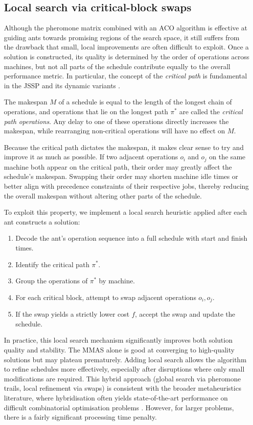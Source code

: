 \documentclass[final-report]{report-template}
\begin{document}
\subsection{Local search via critical-block swaps}
Although the pheromone matrix combined with an ACO algorithm is effective at guiding ants towards promising regions of the search space, it still suffers from the drawback that small, local improvements are often difficult to exploit. Once a solution is constructed, its quality is determined by the order of operations across machines, but not all parts of the schedule contribute equally to the overall performance metric. In particular, the concept of the \emph{critical path} is fundamental in the JSSP and its dynamic variants \cite{naderi2022critical}.

The makespan $M$ of a schedule is equal to the length of the longest chain of operations, and operations that lie on the longest path $\pi^*$ are called the \emph{critical path operations}. Any delay to one of these operations directly increases the makespan, while rearranging non-critical operations will have no effect on $M$.

Because the critical path dictates the makespan, it makes clear sense to try and improve it as much as possible. If two adjacent operations $o_i$ and $o_j$ on the same machine both appear on the critical path, their order may greatly affect the schedule's makespan. Swapping their order may shorten machine idle times or better align with precedence constraints of their respective jobs, thereby reducing the overall makespan without altering other parts of the schedule. 

To exploit this property, we implement a local search heuristic applied after each ant constructs a solution:

\begin{enumerate}
    \item Decode the ant's operation sequence into a full schedule with start and finish times.
    \item Identify the critical path $\pi^*$.
    \item Group the operations of $\pi^*$ by machine.
    \item For each critical block, attempt to swap adjacent operations $o_i, o_j$. 
    \item If the swap yields a strictly lower cost $f$, accept the swap and update the schedule.
\end{enumerate}

In practice, this local search mechanism significantly improves both solution quality and stability. The MMAS alone is good at converging to high-quality solutions but may plateau prematurely. Adding local search allows the algorithm to refine schedules more effectively, especially after disruptions where only small modifications are required. This hybrid approach (global search via pheromone trails, local refinement via swaps) is consistent with the broader metaheuristics literature, where hybridisation often yields state-of-the-art performance on difficult combinatorial optimisation problems \cite{jssp-manufacturing}. However, for larger problems, there is a fairly significant processing time penalty.
\end{document}
